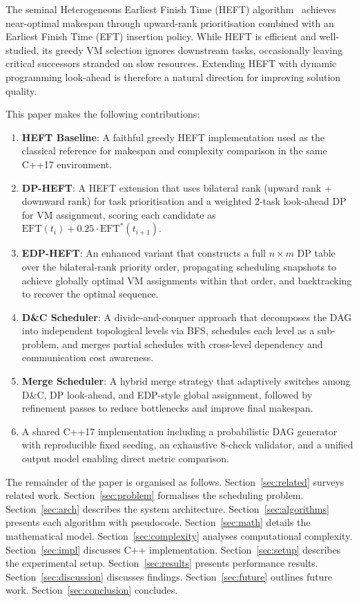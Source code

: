\documentclass[conference]{IEEEtran}
\newcommand{\EFT}{\mathrm{EFT}}
\begin{document}
The seminal Heterogeneous Earliest Finish Time (HEFT)
algorithm~\cite{topcuoglu2002heft} achieves near-optimal makespan
through upward-rank prioritisation combined with an Earliest Finish
Time (EFT) insertion policy. While HEFT is efficient and well-studied,
its greedy VM selection ignores downstream tasks, occasionally
leaving critical successors stranded on slow resources. Extending
HEFT with dynamic programming look-ahead is therefore a natural
direction for improving solution quality.

This paper makes the following contributions:
\begin{enumerate}
      \item \textbf{HEFT Baseline}: A faithful greedy HEFT implementation
                        used as the classical reference for makespan and complexity
                        comparison in the same C++17 environment.
  \item \textbf{DP-HEFT}: A HEFT extension that uses bilateral rank
        (upward rank + downward rank) for task prioritisation and a
        weighted 2-task look-ahead DP for VM assignment, scoring each
        candidate as $\EFT(t_i) + 0.25 \cdot \EFT^*(t_{i+1})$.
  \item \textbf{EDP-HEFT}: An enhanced variant that constructs a full
        $n \times m$ DP table over the bilateral-rank priority order,
        propagating scheduling snapshots to achieve globally optimal
        VM assignments within that order, and backtracking to recover
        the optimal sequence.
  \item \textbf{D\&C Scheduler}: A divide-and-conquer approach that
        decomposes the DAG into independent topological levels via BFS,
        schedules each level as a sub-problem, and merges partial
        schedules with cross-level dependency and communication cost
        awareness.
  \item \textbf{Merge Scheduler}: A hybrid merge strategy that
        adaptively switches among D\&C, DP look-ahead, and EDP-style
        global assignment, followed by refinement passes to reduce
        bottlenecks and improve final makespan.
  \item A shared C++17 implementation including a probabilistic DAG
        generator with reproducible fixed seeding, an exhaustive
        8-check validator, and a unified output model enabling
        direct metric comparison.
\end{enumerate}

The remainder of the paper is organised as follows.
Section~\ref{sec:related} surveys related work.
Section~\ref{sec:problem} formalises the scheduling problem.
Section~\ref{sec:arch} describes the system architecture.
Section~\ref{sec:algorithms} presents each algorithm with pseudocode.
Section~\ref{sec:math} details the mathematical model.
Section~\ref{sec:complexity} analyses computational complexity.
Section~\ref{sec:impl} discusses C++ implementation.
Section~\ref{sec:setup} describes the experimental setup.
Section~\ref{sec:results} presents performance results.
Section~\ref{sec:discussion} discusses findings.
Section~\ref{sec:future} outlines future work.
Section~\ref{sec:conclusion} concludes.
\end{document}
